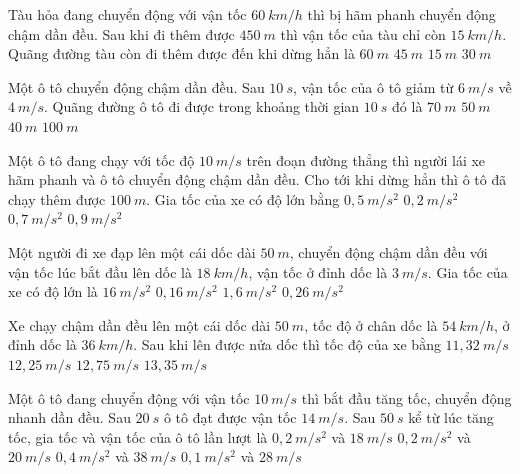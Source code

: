 \begin{ex}%
Tàu hỏa đang chuyển động với vận tốc $60 \ km/h$ thì bị hãm phanh chuyển động chậm dần đều. Sau khi đi thêm được $450\ m$ thì vận tốc của tàu chỉ còn $15 \ km/h$. Quãng đường tàu còn đi thêm được đến khi dừng hẳn là
\choice
{$60\ m$}
{$45\ m$}
{$15\ m$}
{\True $30\ m$}
\loigiai{}
\end{ex}
\begin{ex}%
Một ô tô chuyển động chậm dần đều. Sau $10\ s$, vận tốc của ô tô giảm từ $6 \ m/s$ về $4 \ m/s$. Quãng đường ô tô đi được trong khoảng thời gian $10\ s$ đó là
\choice
{$70\ m$}
{\True $50\ m$}
{$40\ m$}
{$100\ m$}
\loigiai{}
\end{ex}
\begin{ex}%
Một ô tô đang chạy với tốc độ $10 \ m/s$ trên đoạn đường thẳng thì người lái xe hãm phanh và ô tô chuyển động chậm dần đều. Cho tới khi dừng hẳn thì ô tô đã chạy thêm được $100\ m$. Gia tốc của xe có độ lớn bằng
\choice
{\True $0,5 \ m/s^2$}
{$0,2 \ m/s^2$}
{$0,7 \ m/s^2$}
{$0,9 \ m/s^2$}
\loigiai{

}
\end{ex}
\begin{ex}%
Một người đi xe đạp lên một cái dốc dài $50\ m$, chuyển động chậm dần đều với vận tốc lúc bắt đầu lên dốc là $18 \ km/h$, vận tốc ở đỉnh dốc là $3 \ m/s$. Gia tốc của xe có độ lớn là
\choice
{$16 \ m/s^2$}
{\True $0,16 \ m/s^2$}
{$1,6 \ m/s^2$}
{$0,26\ m/s^2$}
\loigiai{}
\end{ex}
\begin{ex}%
Xe chạy chậm dần đều lên một cái dốc dài $50\ m$, tốc độ ở chân dốc là $54 \ km/h$, ở đỉnh dốc là $36 \ km/h$. Sau khi lên được nửa dốc thì tốc độ của xe bằng
\choice
{$11,32 \ m/s$}
{$12,25 \ m/s$}
{\True $12,75 \ m/s$}
{$13,35 \ m/s$}
\loigiai{

}
\end{ex}
\begin{ex}%
Một ô tô đang chuyển động với vận tốc $10\ m/s$ thì bắt đầu tăng tốc, chuyển động nhanh dần đều. Sau $20\ s$ ô tô đạt được vận tốc $14 \ m/s$. Sau $50\ s$ kể từ lúc tăng tốc, gia tốc và vận tốc của ô tô lần lượt là
\choice
{$0,2 \ m/s^2$ và $18 \ m/s$}
{\True $0,2 \ m/s^2$ và $20 \ m/s$}
{$0,4 \ m/s^2$ và $38 \ m/s$}
{$0,1 \ m/s^2$ và $28 \ m/s$}
\loigiai{

}
\end{ex}









